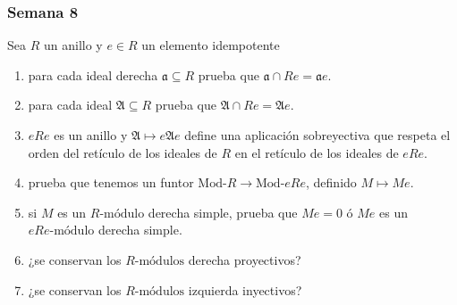 \documentclass[11pt]{article}
\begin{document}
\subsubsection*{Semana 8}
\label{sec-7-4-7}
\begin{statement}
Sea $R$ un anillo y $e \in R$ un elemento idempotente

\begin{enumerate}
\item para cada ideal derecha $\mathfrak{a} \subseteq R$ prueba que $\mathfrak{a} \cap Re = \mathfrak{a}e$.
\item para cada ideal $\mathfrak{A} \subseteq R$ prueba que $\mathfrak{A} \cap Re = \mathfrak{A}e$.
\item $eRe$ es un anillo y $\mathfrak{A} \mapsto e\mathfrak{A}e$ define una aplicación sobreyectiva que respeta
el orden del retículo de los ideales de $R$ en el retículo de los ideales de
$eRe$.
\item prueba que tenemos un funtor $\text{Mod-}R \to \text{Mod-}eRe$, definido $M \mapsto Me$.
\item si $M$ es un $R\text{-módulo}$ derecha simple, prueba que $Me = 0$ ó $Me$ es un
$eRe\text{-módulo}$ derecha simple.
\item ¿se conservan los $R\text{-módulos}$ derecha proyectivos?
\item ¿se conservan los $R\text{-módulos}$ izquierda inyectivos?
\end{enumerate}
\end{statement}
\end{document}
